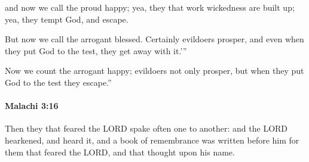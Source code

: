 			\begin{versebox}
					\item[BHS] 
					\item[LXX] 
					\item[ASV] and now we call the proud happy; yea, they that work wickedness are built up; yea, they tempt God, and escape.
					\item[NIV] But now we call the arrogant blessed. Certainly evildoers prosper, and even when they put God to the test, they get away with it.’”
					\item[NRSV] Now we count the arrogant happy; evildoers not only prosper, but when they put God to the test they escape.”
			\end{versebox}

		\paragraph{Malachi 3:16} %
			\label{MALACHI-3-16}

			Then they that feared the LORD spake often one to another: and the LORD hearkened, and heard it, and a book of remembrance was written before him for them that feared the LORD, and that thought upon his name.

